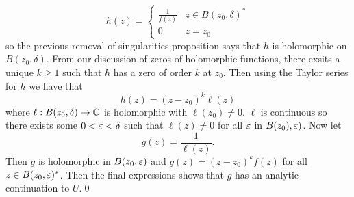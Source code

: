 \documentclass{article}
\begin{document}
\[
  h(z) = \begin{cases}
	  \frac 1{f(z)} & z\in B(z_0, \delta)^*\\
	  0 & z=z_0
  \end{cases}
\]
so the previous removal of singularities proposition says that $ h $ is holomorphic on $ B(z_0,\delta) $. From our discussion of zeros of holomorphic functions, there exsits a unique $ k \ge 1$ such that $ h $ has a zero of order $ k $ at $ z_0 $. Then using the Taylor series for $ h $ we have that
\[
  h(z) = (z-z_0)^k \ell(z)
\] 
where $ \ell: B(z_0,\delta)\to \mathbb{C} $ is holomorphic with $ \ell(z_0)\ne 0 $. $ \ell $ is continuous so there exists some $ 0<\varepsilon < \delta $ such that $ \ell(z) \ne 0 $ for all $ \varepsilon $ in $ B(z_0),\varepsilon) $. Now let
\[
	g(z) = \frac 1{\ell(z)}.
\]
Then $ g $ is holomorphic in $ B(z_0,\varepsilon) $ and $ g(z) = (z-z_0)^k f(z) $ for all $ z\in B(z_0,\varepsilon)^* $. Then the final expressions shows that $ g $ has an analytic continuation to $ U $.\qed 
\end{document}
